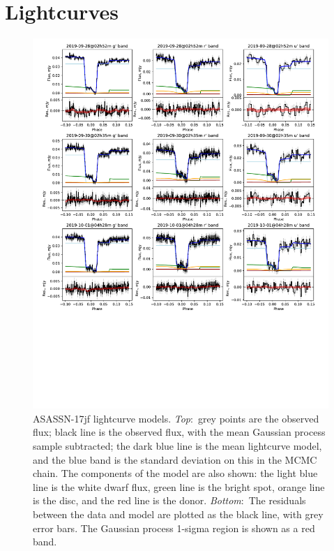 \clearpage
\onecolumn
\section{Lightcurves}
\label{appendix:lightcurves}

\begin{figure}
    \centering
    \includegraphics[width=\columnwidth, trim={0 10cm 0 0}, clip]{figures/three_cvs_with_weird_colours/ASASSN-17jf/ASASSN-17jf_lightcurves_3.pdf}
    \caption{ASASSN-17jf lightcurve models. {\it Top}:~grey points are the observed flux; black line is the observed flux, with the mean Gaussian process sample subtracted; the dark blue line is the mean lightcurve model, and the blue band is the standard deviation on this in the MCMC chain. The components of the model are also shown: the light blue line is the white dwarf flux, green line is the bright spot, orange line is the disc, and the red line is the donor. {\it Bottom}:~The residuals between the data and model are plotted as the black line, with grey error bars. The Gaussian process 1-sigma region is shown as a red band.}
    \label{fig:ASASSN-17jf all lightcurves}
\end{figure}

